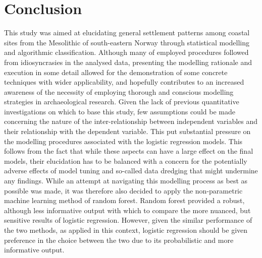 \documentclass[12pt, a4paper]{article}
\begin{document}
\section{Conclusion}
This study was aimed at elucidating general settlement patterns among coastal sites from the Mesolithic of south-eastern Norway through statistical modelling and algorithmic classification. Although many of employed procedures followed from idiosyncrasies in the analysed data, presenting the modelling rationale and execution in some detail allowed for the demonstration of some concrete techniques with wider applicability, and hopefully contributes to an increased awareness of the necessity of employing thorough and conscious modelling strategies in archaeological research. Given the lack of previous quantitative investigations on which to base this study, few assumptions could be made concerning the nature of the inter-relationship between independent variables and their relationship with the dependent variable. This put substantial pressure on the modelling procedures associated with the logistic regression models. This follows from the fact that while these aspects can have a large effect on the final models, their elucidation has to be balanced with a concern for the potentially adverse effects of model tuning and so-called data dredging that might undermine any findings. While an attempt at navigating this modelling process as best as possible was made, it was therefore also decided to apply the non-parametric machine learning method of random forest. Random forest provided a robust, although less informative output with which to compare the more nuanced, but sensitive results of logistic regression. However, given the similar performance of the two methods, as applied in this context, logistic regression should be given preference in the choice between the two due to its probabilistic and more informative output.\par 
\end{document}
